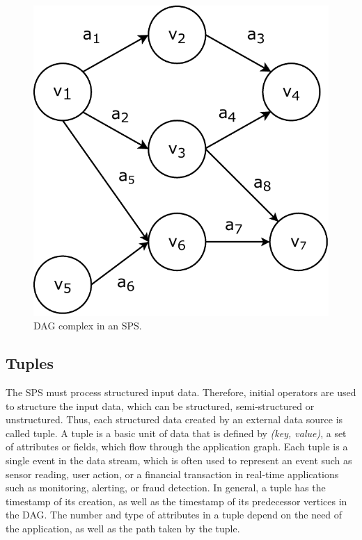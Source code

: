 \begin{figure}[ht!]
  \centering
    \includegraphics[scale=0.6]{figures/concepts/SPS-DAG-Complex.pdf}
  \caption{DAG complex in an SPS.}
  \label{fig:sps-dag-complex}
\end{figure}

\subsection{Tuples}
The SPS must process structured input data. Therefore, initial operators are used to structure the input data, which can be structured, semi-structured or unstructured. Thus, each structured data created by an external data source is called tuple. A tuple is a basic unit of data that is defined by \textit{(key, value)}, a set of attributes or fields, which flow through the application graph. Each tuple is a single event in the data stream, which is often used to represent an event such as sensor reading, user action, or a financial transaction in real-time applications such as monitoring, alerting, or fraud detection. In general, a tuple has the timestamp of its creation, as well as the timestamp of its predecessor vertices in the DAG. The number and type of attributes in a tuple depend on the need of the application, as well as the path taken by the tuple.

